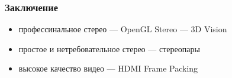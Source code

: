 \documentclass[ucs]{beamer}
\begin{document}
\begin{frame}
	\frametitle{Заключение}
	\begin{itemize}
		\item профессинальное стерео --- OpenGL Stereo --- 3D Vision \\
		\item простое и нетребовательное стерео --- стереопары \\
		\item высокое качество видео --- HDMI Frame Packing \\
	\end{itemize}
\end{frame}
\end{document}
